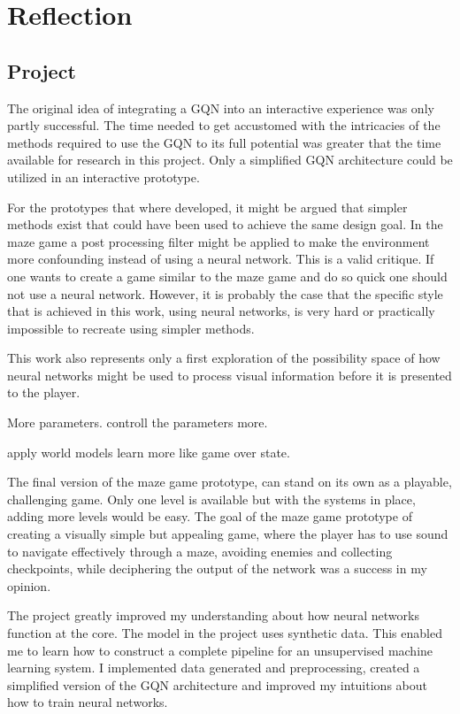 
\chapter{Reflection}
\section{Project}
The original idea of integrating a GQN into an interactive experience was only partly successful. The time needed to get accustomed with the intricacies of the methods required to use the GQN to its full potential was greater that the time available for research in this project. Only a simplified GQN architecture could be utilized in an interactive prototype.

For the prototypes that where developed, it might be argued that simpler methods exist that could have been used to achieve the same design goal. In the maze game a post processing filter might be applied to make the environment more confounding instead of using a neural network. This is a valid critique. If one wants to create a game similar to the maze game and do so quick one should not use a neural network. However, it is probably the case that the specific style that is achieved in this work, using neural networks, is very hard or practically impossible to recreate using simpler methods.

This work also represents only a first exploration of the possibility space of how neural networks might be used to process visual information before it is presented to the player.

More parameters. controll the parameters more.

apply world models \cite{Ha2018-dd} learn more like game over state.



The final version of the maze game prototype, can stand on its own as a playable, challenging game. Only one level is available but with the systems in place, adding more levels would be easy. The goal of the maze game prototype of creating a visually simple but appealing game, where the player has to use sound to navigate effectively through a maze, avoiding enemies and collecting checkpoints, while deciphering the output of the network was a success in my opinion.

The project greatly improved my understanding about how neural networks function at the core. The model in the project uses synthetic data. This enabled me to learn how to construct a complete pipeline for an unsupervised machine learning system. I implemented data generated and preprocessing, created a simplified version of the GQN architecture and improved my intuitions about how to train neural networks.

